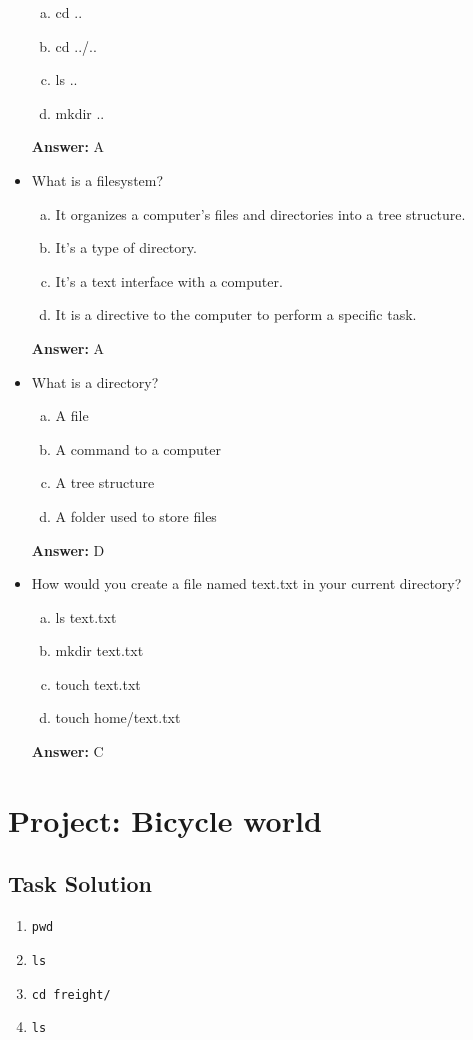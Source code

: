 \documentclass[12pt]{article}
\begin{document}
\begin{itemize}
    \begin{enumerate}[a)]
        \item cd ..
        \item cd ../..
        \item ls ..
        \item mkdir ..
    \end{enumerate}

    \bigskip

    \textbf{Answer:} A

    \item What is a filesystem?
    \begin{enumerate}[a)]
        \item It organizes a computer’s files and directories into a tree structure.
        \item It’s a type of directory.
        \item It’s a text interface with a computer.
        \item It is a directive to the computer to perform a specific task.
    \end{enumerate}

    \bigskip

    \textbf{Answer:} A

    \item What is a directory?
    \begin{enumerate}[a)]
        \item A file
        \item A command to a computer
        \item A tree structure
        \item A folder used to store files
    \end{enumerate}

    \bigskip

    \textbf{Answer:} D

    \item How would you create a file named text.txt in your current directory?
    \begin{enumerate}[a)]
        \item ls text.txt
        \item mkdir text.txt
        \item touch text.txt
        \item touch home/text.txt
    \end{enumerate}

    \bigskip

    \textbf{Answer:} C
\end{itemize}

\section{Project: Bicycle world}
\subsection{Task Solution}
\begin{enumerate}[1.]
    \item \texttt{pwd}
    \item \texttt{ls}
    \item \texttt{cd freight/}
    \item \texttt{ls}
\end{enumerate}
\end{document}
